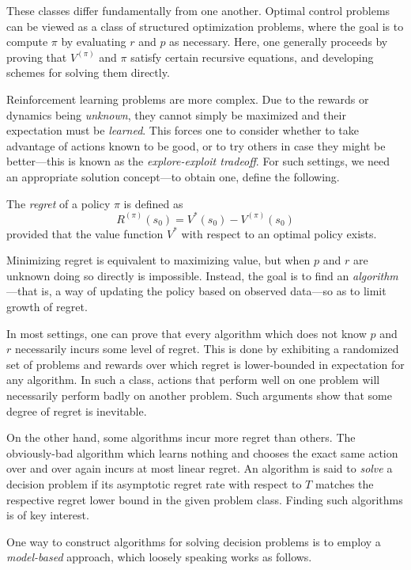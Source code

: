 \documentclass[11pt]{book}
\begin{document}
These classes differ fundamentally from one another. 
Optimal control problems can be viewed as a class of structured optimization problems, where the goal is to compute $\pi$ by evaluating $r$ and $p$ as necessary.
Here, one generally proceeds by proving that $V^{(\pi)}$ and $\pi$ satisfy certain recursive equations, and developing schemes for solving them directly.

Reinforcement learning problems are more complex.
Due to the rewards or dynamics being \emph{unknown}, they cannot simply be maximized and their expectation must be \emph{learned}.
This forces one to consider whether to take advantage of actions known to be good, or to try others in case they might be better---this is known as the \emph{explore-exploit tradeoff}.
For such settings, we need an appropriate solution concept---to obtain one, define the following.

\begin{definition}[Regret]
The \emph{regret} of a policy $\pi$ is defined as 
\[
R^{(\pi)}(s_0) = V^*(s_0) - V^{(\pi)}(s_0)
\]
provided that the value function $V^*$ with respect to an optimal policy exists.
\end{definition}

Minimizing regret is equivalent to maximizing value, but when $p$ and $r$ are unknown doing so directly is impossible.
Instead, the goal is to find an \emph{algorithm}---that is, a way of updating the policy based on observed data---so as to limit growth of regret.

In most settings, one can prove that every algorithm which does not know $p$ and $r$ necessarily incurs some level of regret.
This is done by exhibiting a randomized set of problems and rewards over which regret is lower-bounded in expectation for any algorithm.
In such a class, actions that perform well on one problem will necessarily perform badly on another problem.
Such arguments show that some degree of regret is inevitable.

On the other hand, some algorithms incur more regret than others.
The obviously-bad algorithm which learns nothing and chooses the exact same action over and over again incurs at most linear regret.
An algorithm is said to \emph{solve} a decision problem if its asymptotic regret rate with respect to $T$ matches the respective regret lower bound in the given problem class.
Finding such algorithms is of key interest.

One way to construct algorithms for solving decision problems is to employ a \emph{model-based} approach, which loosely speaking works as follows.
\end{document}
